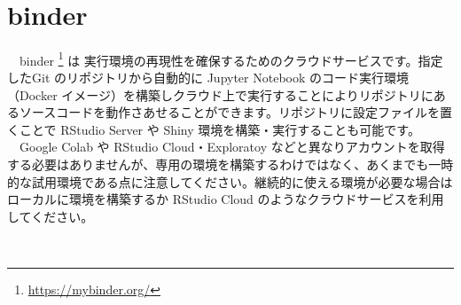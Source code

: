 \documentclass[
  12pt,
]{book}
\DeclareRobustCommand{\href}[2]{#2\footnote{\url{#1}}}
\begin{document}
　

\hypertarget{binder}{%
\section{binder}\label{binder}}

　\href{https://mybinder.org/}{binder } は 実行環境の再現性を確保するためのクラウドサービスです。指定したGit のリポジトリから自動的に Jupyter Notebook のコード実行環境（Docker イメージ）を構築しクラウド上で実行することによりリポジトリにあるソースコードを動作さあせることができます。リポジトリに設定ファイルを置くことで RStudio Server や Shiny 環境を構築・実行することも可能です。\\
　Google Colab や RStudio Cloud・Exploratoy などと異なりアカウントを取得する必要はありませんが、専用の環境を構築するわけではなく、あくまでも一時的な試用環境である点に注意してください。継続的に使える環境が必要な場合は ローカルに環境を構築するか RStudio Cloud のようなクラウドサービスを利用してください。

　

  
\end{document}
